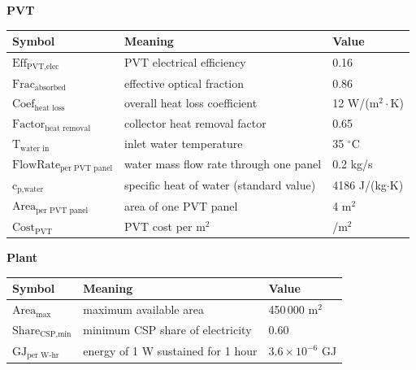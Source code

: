 \documentclass[11pt,a4paper]{article}
\newcommand{\T}[1]{\text{#1}}
\begin{document}
\vspace{6pt}\textbf{PVT}\\[2pt]
\begin{tabular}{@{}lll@{}}
\toprule
Symbol & Meaning & Value\\\midrule
$\T{Eff}_{\T{PVT,elec}}$ & PVT electrical efficiency & 0.16\\
$\T{Frac}_{\T{absorbed}}$ & effective optical fraction & 0.86\\
$\T{Coef}_{\T{heat loss}}$ & overall heat loss coefficient & 12 W/(m$^2\cdot$K)\\
$\T{Factor}_{\T{heat removal}}$ & collector heat removal factor & 0.65\\
$\T{T}_{\T{water in}}$ & inlet water temperature & 35 $^\circ$C\\
$\T{FlowRate}_{\T{per PVT panel}}$ & water mass flow rate through one panel & 0.2 kg/s\\
$\T{c}_{\T{p,water}}$ & specific heat of water (standard value) & 4186 J/(kg$\cdot$K)\\
$\T{Area}_{\T{per PVT panel}}$ & area of one PVT panel & 4 m$^2$\\
$\T{Cost}_{\T{PVT}}$ & PVT cost per m$^2$ & \texteuro150/m$^2$\\
\bottomrule
\end{tabular}

\vspace{6pt}\textbf{Plant}\\[2pt]
\begin{tabular}{@{}lll@{}}
\toprule
Symbol & Meaning & Value\\\midrule
$\T{Area}_{\T{max}}$ & maximum available area & 450\,000 m$^2$\\
$\T{Share}_{\T{CSP,min}}$ & minimum CSP share of electricity & 0.60\\
$\T{GJ}_{\T{per W-hr}}$ & energy of 1 W sustained for 1 hour & $3.6\times10^{-6}$ GJ\\
\bottomrule
\end{tabular}
\end{document}
